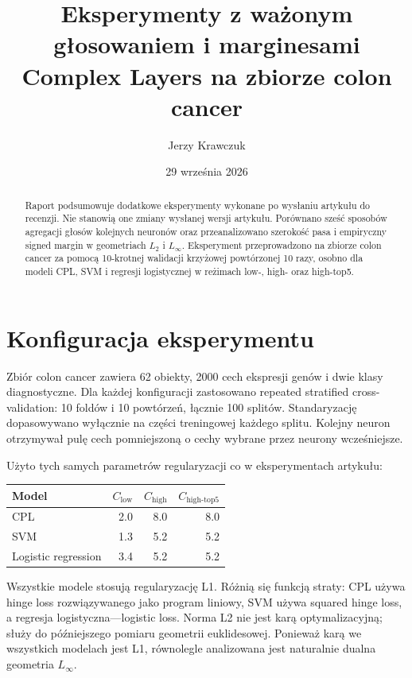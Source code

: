 \documentclass[11pt,a4paper]{article}
\title{Eksperymenty z ważonym głosowaniem i marginesami\\
\large Complex Layers na zbiorze colon cancer}
\author{Jerzy Krawczuk}
\date{29 września 2026}
\begin{document}
\maketitle

\begin{abstract}
Raport podsumowuje dodatkowe eksperymenty wykonane po wysłaniu artykułu do recenzji. Nie stanowią one
zmiany wysłanej wersji artykułu. Porównano sześć sposobów agregacji głosów kolejnych neuronów oraz
przeanalizowano szerokość pasa i empiryczny signed margin w geometriach $L_2$ i $L_\infty$.
Eksperyment przeprowadzono na zbiorze colon cancer za pomocą 10-krotnej walidacji krzyżowej powtórzonej
10 razy, osobno dla modeli CPL, SVM i regresji logistycznej w reżimach low-, high- oraz high-top5.
\end{abstract}

\section{Konfiguracja eksperymentu}

Zbiór colon cancer zawiera 62 obiekty, 2000 cech ekspresji genów i dwie klasy diagnostyczne. Dla każdej
konfiguracji zastosowano repeated stratified cross-validation: 10 foldów i 10 powtórzeń, łącznie 100 splitów.
Standaryzację dopasowywano wyłącznie na części treningowej każdego splitu. Kolejny neuron otrzymywał pulę
cech pomniejszoną o cechy wybrane przez neurony wcześniejsze.

Użyto tych samych parametrów regularyzacji co w eksperymentach artykułu:

\begin{center}
\begin{tabular}{lrrr}
\toprule
Model & $C_{\mathrm{low}}$ & $C_{\mathrm{high}}$ & $C_{\mathrm{high\text{-}top5}}$ \\
\midrule
CPL & 2.0 & 8.0 & 8.0 \\
SVM & 1.3 & 5.2 & 5.2 \\
Logistic regression & 3.4 & 5.2 & 5.2 \\
\bottomrule
\end{tabular}
\end{center}

Wszystkie modele stosują regularyzację L1. Różnią się funkcją straty: CPL używa hinge loss rozwiązywanego
jako program liniowy, SVM używa squared hinge loss, a regresja logistyczna---logistic loss. Norma L2 nie jest
karą optymalizacyjną; służy do późniejszego pomiaru geometrii euklidesowej. Ponieważ karą we wszystkich
modelach jest L1, równolegle analizowana jest naturalnie dualna geometria $L_\infty$.
\end{document}
